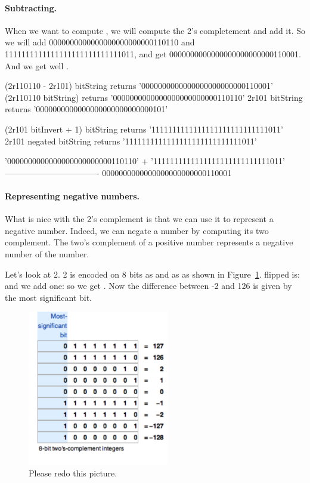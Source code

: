 \documentclass[a4paper,10pt,twoside]{book}
\begin{document}
\paragraph{Subtracting.}
When we want to compute , we will compute the 2's completement and add it. 
So we will add 0000000000000000000000000110110 and 1111111111111111111111111111011, and get 0000000000000000000000000110001. And we get well .

\begin{code}{}
(2r110110 - 2r101) bitString	
	returns '0000000000000000000000000110001'
(2r110110 bitString) 	
	returns '0000000000000000000000000110110'
2r101 bitString
	returns '0000000000000000000000000000101'		
							
(2r101 bitInvert + 1) bitString
	returns '1111111111111111111111111111011'	
2r101 negated bitString
	returns '1111111111111111111111111111011'	
	
	'0000000000000000000000000110110' + 
	'1111111111111111111111111111011'	
	----------------------------------
	0000000000000000000000000110001	
\end{code}

\paragraph{Representing negative numbers.}
What is nice with the 2's complement is that we can use it to represent a negative number. Indeed, we can negate a number by computing its two complement. The two's complement of a positive number represents a negative number of the number.

Let's look at 2. 2 is encoded on 8 bits as  and  as  as shown in Figure~\ref{negativePositive}.
 flipped is:  and we add one: so we get .
Now the difference between  -2  and 126  is given by the most significant bit. 

\begin{figure}[h]
\begin{center}
\includegraphics[width=0.55\textwidth]{toRedo}
\caption{Please redo this picture. \label{negativePositive}}
\end{center}
\end{figure}
\end{document}
